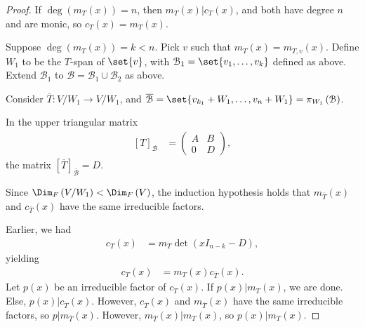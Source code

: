 \documentclass[10pt]{mypackage}
\begin{document}
\begin{proof}
  If $\deg\left(m_T(x)\right) = n$, then $ m_T(x)|c_T(x)$, and both have degree $n$ and are monic, so $c_T(x) = m_T(x)$.\newline

  Suppose $\deg\left(m_T(x)\right) = k < n$. Pick $v$ such that $m_T(x) = m_{T,v}(x)$. Define $W_1$ to be the $T$-span of $\set{v}$, with $\mathcal{B}_1 = \set{v_1,\dots,v_k}$ defined as above. Extend $\mathcal{B}_1$ to $\mathcal{B} = \mathcal{B}_1 \cup \mathcal{B}_2$ as above.\newline

  Consider $\overline{T}: V/W_1 \rightarrow V/W_1$, and $\overline{\mathcal{B}} = \set{v_{k_1}+W_1,\dots,v_{n}+W_1}=  \pi_{W_1}\left(\mathcal{B}\right)$.\newline

  In the upper triangular matrix
  \begin{align*}
    \left[T\right]_{\mathcal{B}} &= \begin{pmatrix}A & B \\ 0 & D\end{pmatrix},
  \end{align*}
  the matrix $\left[\overline{T}\right]_{\overline{\mathcal{B}}} = D$.\newline

  Since $\Dim_{F}\left(V/W_1\right) < \Dim_{F}\left(V\right)$, the induction hypothesis holds that $m_{\overline{T}}(x)$ and $c_{\overline{T}}(x)$ have the same irreducible factors.\newline

  Earlier, we had
  \begin{align*}
    c_{T}(x) &= m_{T}\det\left(xI_{n-k}-D\right),
  \end{align*}
  yielding
  \begin{align*}
    c_{T}(x) &= m_{T}(x)c_{\overline{T}}(x).
  \end{align*}
  Let $p(x)$ be an irreducible factor of $c_{T}(x)$. If $p(x)|m_{T}(x)$, we are done. Else, $p(x)|c_{\overline{T}}(x)$. However, $c_{\overline{T}}(x)$ and $m_{\overline{T}}(x)$ have the same irreducible factors, so $p|m_{\overline{T}}(x)$. However, $m_{\overline{T}}(x)|m_{T}(x)$, so $p(x)|m_{T}(x)$.
\end{proof}
\end{document}
